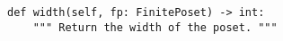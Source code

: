 \begin{verbatim}
def width(self, fp: FinitePoset) -> int:
    """ Return the width of the poset. """
\end{verbatim}